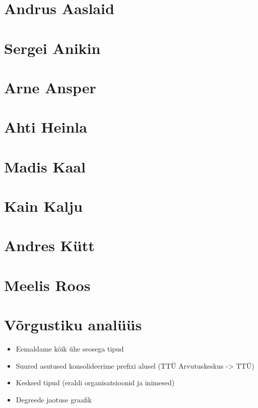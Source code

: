 \documentclass{tufte-book}
\begin{document}
\chapter{Andrus Aaslaid}


\chapter{Sergei Anikin}


\chapter{Arne Ansper}


\chapter{Ahti Heinla}


\chapter{Madis Kaal}


\chapter{Kain Kalju}


\chapter{Andres Kütt}


\chapter{Meelis Roos}



\chapter{Võrgustiku analüüs}
\begin{itemize}
	\item Eemaldame kõik ühe seosega tipud
	\item Suured asutused konsolideerime prefixi alusel (TTÜ Arvutuskeskus -> TTÜ)
	\item Kesksed tipud (eraldi organisatsioonid ja inimesed)
	\item Degreede jaotuse graafik
\end{itemize}
\end{document}
